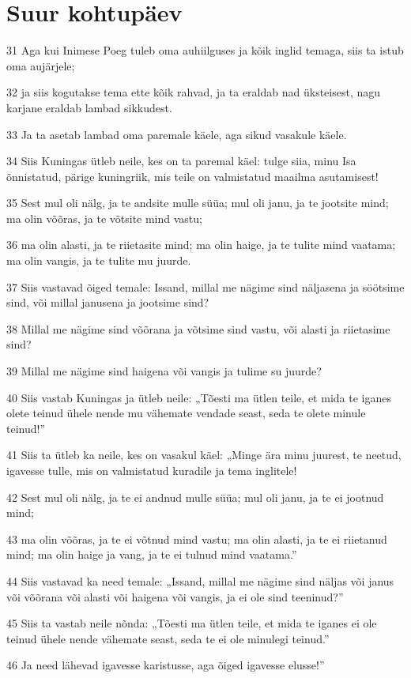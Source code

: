 \section*{Suur kohtupäev}

\par 31 Aga kui Inimese Poeg tuleb oma auhiilguses ja kõik inglid temaga, siis ta istub oma aujärjele;
\par 32 ja siis kogutakse tema ette kõik rahvad, ja ta eraldab nad üksteisest, nagu karjane eraldab lambad sikkudest.
\par 33 Ja ta asetab lambad oma paremale käele, aga sikud vasakule käele.
\par 34 Siis Kuningas ütleb neile, kes on ta paremal käel: tulge siia, minu Isa õnnistatud, pärige kuningriik, mis teile on valmistatud maailma asutamisest!
\par 35 Sest mul oli nälg, ja te andsite mulle süüa; mul oli janu, ja te jootsite mind; ma olin võõras, ja te võtsite mind vastu;
\par 36 ma olin alasti, ja te riietasite mind; ma olin haige, ja te tulite mind vaatama; ma olin vangis, ja te tulite mu juurde.
\par 37 Siis vastavad õiged temale: Issand, millal me nägime sind näljasena ja söötsime sind, või millal janusena ja jootsime sind?
\par 38 Millal me nägime sind võõrana ja võtsime sind vastu, või alasti ja riietasime sind?
\par 39 Millal me nägime sind haigena või vangis ja tulime su juurde?
\par 40 Siis vastab Kuningas ja ütleb neile: „Tõesti ma ütlen teile, et mida te iganes olete teinud ühele nende mu vähemate vendade seast, seda te olete minule teinud!”
\par 41 Siis ta ütleb ka neile, kes on vasakul käel: „Minge ära minu juurest, te neetud, igavesse tulle, mis on valmistatud kuradile ja tema inglitele!
\par 42 Sest mul oli nälg, ja te ei andnud mulle süüa; mul oli janu, ja te ei jootnud mind;
\par 43 ma olin võõras, ja te ei võtnud mind vastu; ma olin alasti, ja te ei riietanud mind; ma olin haige ja vang, ja te ei tulnud mind vaatama.”
\par 44 Siis vastavad ka need temale: „Issand, millal me nägime sind näljas või janus või võõrana või alasti või haigena või vangis, ja ei ole sind teeninud?”
\par 45 Siis ta vastab neile nõnda: „Tõesti ma ütlen teile, et mida te iganes ei ole teinud ühele nende vähemate seast, seda te ei ole minulegi teinud.”
\par 46 Ja need lähevad igavesse karistusse, aga õiged igavesse elusse!”


